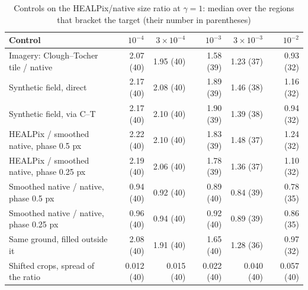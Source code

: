 \begin{table}[t]
\centering
\caption{Controls on the HEALPix/native size ratio at $\gamma=1$: median over the regions that bracket the target (their number in parentheses)}
\label{tab:support_controls}
\footnotesize
\begin{tabular}{@{}lrrrrr@{}}
\toprule
Control & $10^{-4}$ & $3\times10^{-4}$ & $10^{-3}$ & $3\times10^{-3}$ & $10^{-2}$ \\
\midrule
Imagery: Clough--Tocher tile / native & 2.07 (40) & 1.95 (40) & 1.58 (39) & 1.23 (37) & 0.93 (32) \\
Synthetic field, direct & 2.17 (40) & 2.08 (40) & 1.89 (39) & 1.46 (38) & 1.16 (32) \\
Synthetic field, via C--T & 2.17 (40) & 2.10 (40) & 1.90 (39) & 1.39 (38) & 0.94 (32) \\
HEALPix / smoothed native, phase 0.5 px & 2.22 (40) & 2.10 (40) & 1.83 (39) & 1.48 (37) & 1.24 (32) \\
HEALPix / smoothed native, phase 0.25 px & 2.19 (40) & 2.06 (40) & 1.78 (39) & 1.36 (37) & 1.10 (32) \\
Smoothed native / native, phase 0.5 px & 0.94 (40) & 0.92 (40) & 0.89 (40) & 0.84 (39) & 0.78 (35) \\
Smoothed native / native, phase 0.25 px & 0.96 (40) & 0.94 (40) & 0.92 (40) & 0.89 (39) & 0.86 (35) \\
Same ground, filled outside it & 2.08 (40) & 1.91 (40) & 1.65 (40) & 1.28 (36) & 0.97 (32) \\
Shifted crops, spread of the ratio & 0.012 (40) & 0.015 (40) & 0.022 (40) & 0.040 (40) & 0.057 (40) \\
\bottomrule
\end{tabular}
\end{table}
